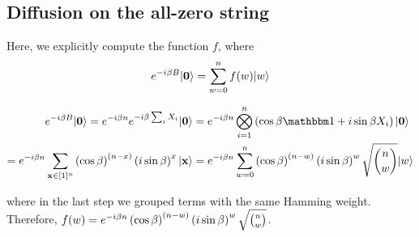 \documentclass[11pt]{article}
\begin{document}
\begin{appendices}
\section{Diffusion on the all-zero string}
\label{appendix:appA}  
Here, we explicitly compute the function $f$, where
$$
e^{-i\beta B}|\mathbf{0}\rangle = \sum\limits_{w=0}^{n}f(w)|w\rangle
$$

\begin{align*}
e^{-i\beta B}\ket{\str{0}}  = e^{-i\beta n}e^{-i\beta \sum_iX_i}\ket{\str{0}} &= e^{-i\beta n}\bigotimes_{i=1}^{n}\paren{\cos\beta\id + i\sin\beta X_i}\ket{\str{0}}\\ 
                   = e^{-i\beta n}\suml{\str{x}\in[1]^n}{}{\paren{\cos\beta}^{\paren{n-x}}\paren{i\sin\beta}^{x}\ket{\str{x}}}&= e^{-i\beta n}\suml{w=0}{n}{\paren{\cos\beta}^{\paren{n-w}}\paren{i\sin\beta}^{w}\sqrt{\binom{n}{w}}\ket{w}}
\end{align*}

where in the last step we grouped terms with the same Hamming weight. Therefore, $f(w) = e^{-i\beta n}\left(\cos\beta\right)^{\left(n-w\right)}\left(i\sin\beta\right)^{w}\sqrt{\binom{n}{w}}$.


\end{appendices}
\end{document}
